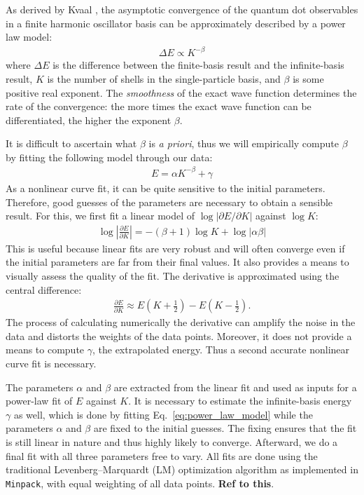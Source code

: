 As derived by Kvaal \cite{PhysRevB.80.045321,Kvaal2007}, the
asymptotic convergence of the quantum dot observables in a finite
harmonic oscillator basis can be approximately described by a power
law model:
\begin{align*}
  \Delta E \propto K^{-\beta}
\end{align*}
where $\Delta E$ is the difference between the finite-basis result and
the infinite-basis result, $K$ is the number of shells in the
single-particle basis, and $\beta$ is some positive real exponent.
The \textit{smoothness} of the exact wave function determines the rate
of the convergence: the more times the exact wave function can be
differentiated, the higher the exponent $\beta$.

It is difficult to ascertain what $\beta$ is \textit{a priori}, thus
we will empirically compute $\beta$ by fitting the following model
through our data:
\begin{align} \label{eq:power_law_model}
  E = \alpha K^{-\beta} + \gamma
\end{align}
As a nonlinear curve fit, it can be quite sensitive to the initial
parameters.  Therefore, good guesses of the parameters are necessary
to obtain a sensible result.  For this, we first fit a linear model of
$\log |\partial E / \partial K|$ against $\log K$:
\begin{align*}
  \log \left|\frac{\partial E}{\partial K}\right| = - (\beta + 1) \log K + \log|\alpha \beta|
\end{align*}
This is useful because linear fits are very robust and will often
converge even if the initial parameters are far from their final values.  It
also provides a means to visually assess the quality of the fit.  The
derivative is approximated using the central difference:
\begin{align*}
  \frac{\partial E}{\partial K} \approx E\left(K + \frac{1}{2}\right) - E\left(K - \frac{1}{2}\right).
\end{align*}
The process of calculating numerically the derivative can amplify the
noise in the data and distorts the weights of the data points.
Moreover, it does not provide a means to compute $\gamma$, the
extrapolated energy.  Thus a second accurate nonlinear curve fit is
necessary.

The parameters $\alpha$ and $\beta$ are extracted from the linear fit
and used as inputs for a power-law fit of $E$ against $K$.  It
is necessary to estimate the infinite-basis energy $\gamma$ as well,
which is done by fitting Eq.~\eqref{eq:power_law_model} while the
parameters $\alpha$ and $\beta$ are fixed to the initial guesses.  The
fixing ensures that the fit is still linear in nature and thus highly
likely to converge.  Afterward, we do a final fit with all three
parameters free to vary.  All fits are done using the traditional
Levenberg--Marquardt (LM) optimization algorithm as implemented
in \texttt{Minpack}, with equal weighting of all data points.  {\bf Ref to this}.

